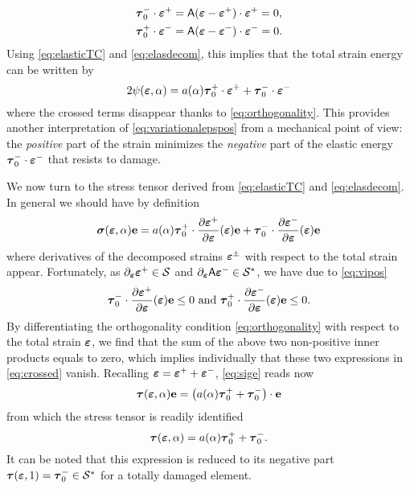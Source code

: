 \begin{equation} \label{eq:orthogonality}
\begin{aligned}
\vtau_0^-\cdot\eps^+ &= \tens{A}(\eps-\eps^+)\cdot\eps^+=0, \\
\vtau_0^+\cdot\eps^- &= \tens{A}(\eps-\eps^-)\cdot\eps^-=0.  
\end{aligned}
\end{equation}
Using \eqref{eq:elasticTC} and \eqref{eq:elasdecom}, this implies that the total strain energy can be written by
\[
2\psi(\eps,\alpha)=a(\alpha)\vtau_0^+\cdot\eps^++\vtau_0^-\cdot\eps^-
\]
where the crossed terms disappear thanks to \eqref{eq:orthogonality}. This provides another interpretation of \eqref{eq:variationalepspos} from a mechanical point of view: the \emph{positive} part of the strain minimizes the \emph{negative} part of the elastic energy $\vtau_0^-\cdot\eps^-$ that resists to damage.

We now turn to the stress tensor derived from \eqref{eq:elasticTC} and \eqref{eq:elasdecom}. In general we should have by definition
\begin{equation} \label{eq:sige}
\sig(\eps,\alpha)\vec{e}=a(\alpha)\vtau_0^+\cdot\frac{\partial\eps^+}{\partial\eps}(\eps)\vec{e}+\vtau_0^-\cdot\frac{\partial\eps^-}{\partial\eps}(\eps)\vec{e}
\end{equation}
where derivatives of the decomposed strains $\eps^\pm$ with respect to the total strain appear. Fortunately, as $\partial_{\eps}\eps^+\in\mathcal{S}$ and $\partial_{\eps}\tens{A}\eps^-\in\mathcal{S}^*$, we have due to \eqref{eq:vipos}
\begin{equation} \label{eq:crossed}
\vtau_0^-\cdot\frac{\partial\eps^+}{\partial\eps}(\eps)\vec{e}\leq 0\text{ and }\vtau_0^+\cdot\frac{\partial\eps^-}{\partial\eps}(\eps)\vec{e}\leq 0.
\end{equation}
By differentiating the orthogonality condition \eqref{eq:orthogonality} with respect to the total strain $\eps$, we find that the sum of the above two non-positive inner products equals to zero, which implies individually that these two expressions in \eqref{eq:crossed} vanish. Recalling $\eps=\eps^++\eps^-$, \eqref{eq:sige} reads now
\begin{equation} \label{eq:stressident}
\vtau(\eps,\alpha)\vec{e}=\bigl(a(\alpha)\vtau_0^++\vtau_0^-\bigr)\cdot\vec{e}
\end{equation}
from which the stress tensor is readily identified
\begin{equation} \label{eq:stressposneg}
\vtau(\eps,\alpha)=a(\alpha)\vtau_0^++\vtau_0^-.
\end{equation}
It can be noted that this expression is reduced to its negative part $\vtau(\eps,1)=\vtau_0^-\in\mathcal{S}^*$ for a totally damaged element.

